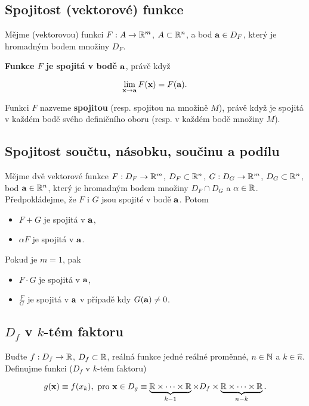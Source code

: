 \subsection*{Spojitost (vektorové) funkce}

Mějme (vektorovou) funkci $F: A \to \mathbb{R}^m$, $A \subset\mathbb{R}^n$, a bod $\mathbf{a} \in
    D_F$, který je hromadným bodem množiny $D_F$.

\textbf{Funkce $F$ je spojitá v bodě $\mathbf{a}$}, právě když

\[ \lim_{\mathbf{x} \to \mathbf{a}} F(\mathbf{x}) = F(\mathbf{a}). \]

\noindent Funkci $F$ nazveme \textbf{spojitou} (resp. spojitou na množině $M$), právě když je spojitá v každém bodě svého definičního oboru (resp. v každém bodě množiny $M$).

\subsection*{Spojitost součtu, násobku, součinu a podílu}

Mějme dvě vektorové funkce $F: D_F \to \mathbb{R}^m$, $D_F \subset \mathbb{R}^n$, $G: D_G \to
    \mathbb{R}^m$, $D_G \subset \mathbb{R}^n$, bod $\mathbf{a} \in \mathbb{R}^n$, který je hromadným bodem množiny
$D_F \cap D_G$ a $\alpha \in \mathbb{R}$. Předpokládejme, že $F$ i $G$ jsou spojité v
bodě $\mathbf{a}$. Potom

\begin{itemize}
    \item $F + G$ je spojitá v $\mathbf{a}$,
    \item $\alpha F$ je spojitá v $\mathbf{a}$.
\end{itemize}

\noindent Pokud je $m = 1$, pak

\begin{itemize}
    \item $F \cdot G$ je spojitá v $\mathbf{a}$,
    \item $\frac{F}{G}$ je spojitá v $\mathbf{a}$ v případě kdy $G(\mathbf{a}) \neq 0$.
\end{itemize}

\subsection*{$D_f$ v $k$-tém faktoru}

Buďte $f: D_f \to \mathbb{R}$, $D_f \subset \mathbb{R}$, reálná funkce jedné reálné proměnné,
$n \in \mathbb{N}$ a $k \in \hat{n}$. Definujme funkci ($D_f$ v $k$-tém faktoru)

\[ g(\mathbf{x}) \equiv f(x_k), \ \text{pro} \ \mathbf{x} \in D_g \equiv
    \underbrace{\mathbb{R} \times \cdots \times \mathbb{R}}_{k-1} \times D_f \times \underbrace{\mathbb{R} \times \cdots \times \mathbb{R}}_{n-k}. \]

